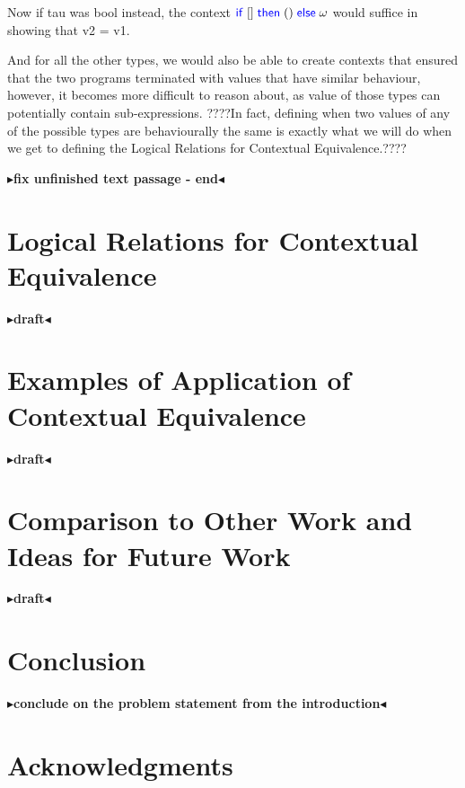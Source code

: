 \documentclass[twoside,11pt,openright]{report}
\newcommand{\Keyword}[1]{{\color{blue} \mathsf{#1}}}
\newcommand{\TT}{()}
\newcommand{\IfCmd}{\Keyword{if}}
\newcommand{\ThenCmd}{\Keyword{then}}
\newcommand{\ElseCmd}{\Keyword{else}}
\def\If#1then#2else#3{\IfCmd{}\;#1\;\ThenCmd{}\;#2\;\ElseCmd{}\;#3}
\newcommand{\todo}[1]{{\color[rgb]{.5,0,0}\textbf{$\blacktriangleright$#1$\blacktriangleleft$}}}
\begin{document}
Now if tau was bool instead, the context $\If [] then \TT else \omega$
would suffice in showing that v2 = v1. 

And for all the other types, we would also be able to create contexts
that ensured that the two programs terminated with values that have
similar behaviour, however, it becomes more difficult to reason about, as
value of those types can potentially contain sub-expressions. ????In fact, defining when two values of any of the possible types are behaviourally the same is exactly what we will do when we get to defining the Logical Relations for Contextual Equivalence.????

\todo{fix unfinished text passage - end}



\chapter{Logical Relations for Contextual Equivalence}
\label{ch:LR}

\todo{draft}


\chapter{Examples of Application of Contextual Equivalence}
\label{ch:ACE}

\todo{draft}


\chapter{Comparison to Other Work and Ideas for Future Work}
\label{ch:COWFW}

\todo{draft}


\chapter{Conclusion}
\label{ch:conclusion}

\todo{conclude on the problem statement from the introduction}

\chapter*{Acknowledgments}
\end{document}
